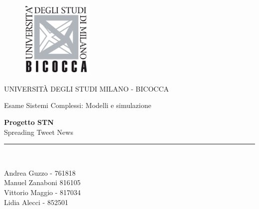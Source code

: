 \begin{titlepage}
    \begin{center}
        \vspace*{-1in}
        \begin{figure}[htb]
            \begin{center}
            \includegraphics[width=3.5cm]{resources/BicoccaLogo.png}
            \end{center}
        \end{figure}
        
        UNIVERSITÀ DEGLI STUDI MILANO - BICOCCA \\
        \vspace*{0.4in}
        
        \begin{large}
            Esame Sistemi Complessi: Modelli e simulazione\\
        \end{large}
        
        \vspace*{0.2in}
        
        \begin{Large}
            \textbf{Progetto STN} \\
            \vspace*{0.15in}
            Spreading Tweet News \\
        \end{Large}
        
        \vspace*{0.3in}
        \vspace*{0.3in}
        \rule{80mm}{0.1mm}\\
        \vspace*{0.1in}
        \begin{large}
            Andrea Guzzo - 761818\\
            Manuel Zanaboni 816105\\
            Vittorio Maggio - 817034\\
            Lidia Alecci - 852501
        \end{large}
    \end{center}
\end{titlepage}